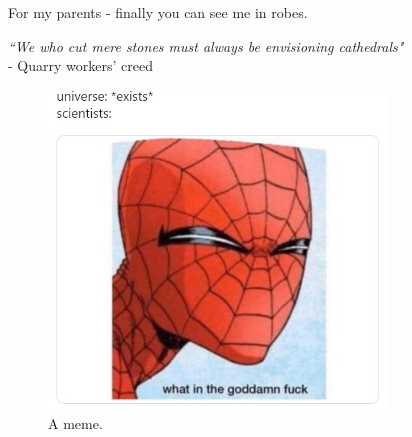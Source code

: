 \newpage
\large{For my parents - finally you can see me in robes.}\newline
\mbox{}
\vfill
\begin{flushright}
\large{\emph{``We who cut mere stones must always be envisioning cathedrals"\\} 
- Quarry workers' creed}
\end{flushright}


\newpage
\thispagestyle{empty}
\vspace{7cm}
\begin{figure}
\centering
\includegraphics[width=0.8\textwidth]{fig/misc/spidey.jpeg}
\caption{A meme.}
\end{figure}



